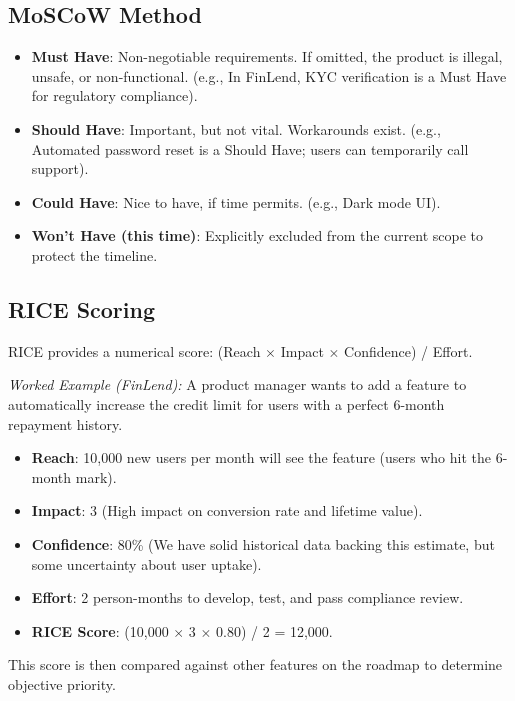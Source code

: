 \documentclass[
  11pt,
  openany,
  oneside]{book}
\providecommand{\tightlist}{%
  \setlength{\itemsep}{0pt}\setlength{\parskip}{0pt}}
\begin{document}
\subsection{MoSCoW Method}\label{moscow-method}

\begin{itemize}
\tightlist
\item
  \textbf{Must Have}: Non-negotiable requirements. If omitted, the
  product is illegal, unsafe, or non-functional. (e.g., In FinLend, KYC
  verification is a Must Have for regulatory compliance).
\item
  \textbf{Should Have}: Important, but not vital. Workarounds exist.
  (e.g., Automated password reset is a Should Have; users can
  temporarily call support).
\item
  \textbf{Could Have}: Nice to have, if time permits. (e.g., Dark mode
  UI).
\item
  \textbf{Won't Have (this time)}: Explicitly excluded from the current
  scope to protect the timeline.
\end{itemize}

\subsection{RICE Scoring}\label{rice-scoring}

RICE provides a numerical score: (Reach \(\times\) Impact \(\times\)
Confidence) / Effort.

\emph{Worked Example (FinLend):} A product manager wants to add a
feature to automatically increase the credit limit for users with a
perfect 6-month repayment history.

\begin{itemize}
\tightlist
\item
  \textbf{Reach}: 10,000 new users per month will see the feature (users
  who hit the 6-month mark).
\item
  \textbf{Impact}: 3 (High impact on conversion rate and lifetime
  value).
\item
  \textbf{Confidence}: 80\% (We have solid historical data backing this
  estimate, but some uncertainty about user uptake).
\item
  \textbf{Effort}: 2 person-months to develop, test, and pass compliance
  review.
\item
  \textbf{RICE Score}: (10,000 \(\times\) 3 \(\times\) 0.80) / 2 =
  12,000.
\end{itemize}

This score is then compared against other features on the roadmap to
determine objective priority.
\end{document}
